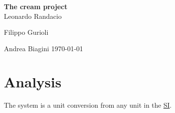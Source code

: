 \documentclass[12pt, a4paper]{report}
\begin{document}
\renewcommand\bibname{References} %


\begin{titlepage}

\begin{center}

\Large \textbf {The cream project}\\%
\vspace{1em}%
\vfill
Leonardo Randacio


Filippo Gurioli


Andrea Biagini
\vspace{1em}
\today

\end{center}

\end{titlepage}


\tableofcontents
\listoffigures
\listoftables

\newpage
{} %

\chapter{Analysis}
The system is a unit conversion from any unit in the \href{https://en.wikipedia.org/wiki/International_System_of_Units}{SI}.
\end{document}
